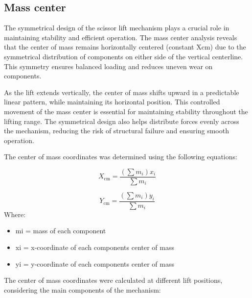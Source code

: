 \documentclass[../../main]{subfiles}
\begin{document}
\subsection{Mass center}

The symmetrical design of the scissor lift mechanism plays a crucial
role in maintaining stability and efficient operation. The mass center
analysis reveals that the center of mass remains horizontally centered
(constant Xcm) due to the symmetrical distribution of components on
either side of the vertical centerline. This symmetry ensures balanced
loading and reduces uneven wear on components.

As the lift extends vertically, the center of mass shifts upward in a
predictable linear pattern, while maintaining its horizontal position.
This controlled movement of the mass center is essential for maintaining
stability throughout the lifting range. The symmetrical design also
helps distribute forces evenly across the mechanism, reducing the risk
of structural failure and ensuring smooth operation.

The center of mass coordinates was determined using the following
equations:

\begin{equation}
  X_{\text{cm}} = \frac{\left(\sum m_i\right) x_i}{\sum m_i}
\end{equation}

\begin{equation}
  Y_{\text{cm}} = \frac{\left(\sum m_i\right) y_i}{\sum m_i}
\end{equation}
Where:

\begin{itemize}
\item
  mi = mass of each component
\item
  xi = x-coordinate of each component\textquotesingle s center of mass
\item
  yi = y-coordinate of each component\textquotesingle s center of mass
\end{itemize}

The center of mass coordinates were calculated at different lift
positions, considering the main components of the mechanism:
\end{document}
